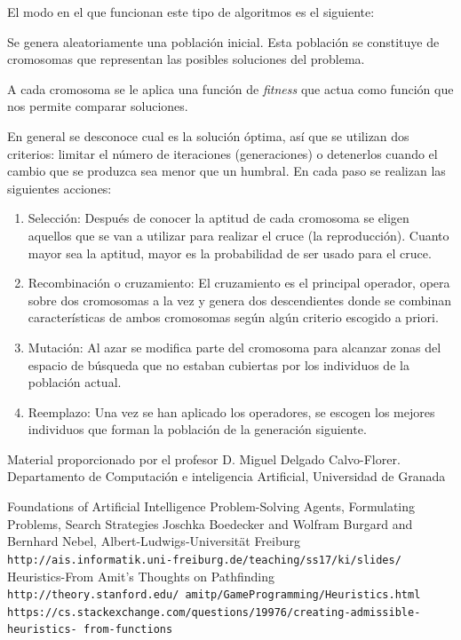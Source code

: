 \documentclass[12pt]{article}
\begin{document}
El modo en el que funcionan este tipo de algoritmos es el siguiente:

Se genera aleatoriamente una población inicial. Esta población se
constituye de cromosomas que representan las posibles soluciones del
problema.

A cada cromosoma se le aplica una función de \textit{fitness} que
actua como función que nos permite comparar soluciones.

En general se desconoce cual es la solución óptima, así que se
utilizan dos criterios: limitar el número de iteraciones
(generaciones) o detenerlos cuando el cambio que se produzca sea menor
que un humbral. En cada paso se realizan las siguientes acciones:

\begin{enumerate}
\item Selección: Después de conocer la aptitud de cada cromosoma se
  eligen aquellos que se van a utilizar para realizar el cruce (la
  reproducción). Cuanto mayor sea la aptitud, mayor es la probabilidad
  de ser usado para el cruce.

\item Recombinación o cruzamiento: El cruzamiento es el principal
  operador, opera sobre dos cromosomas a la vez y genera dos
  descendientes donde se combinan características de ambos cromosomas
  según algún criterio escogido a priori.

\item Mutación: Al azar se modifica parte del cromosoma para alcanzar
  zonas del espacio de búsqueda que no estaban cubiertas por los
  individuos de la población actual.

\item Reemplazo: Una vez se han aplicado los operadores, se escogen
  los mejores individuos que forman la población de la generación
  siguiente.
\end{enumerate}

\begin{thebibliography}{9}
Material proporcionado por el profesor
D. Miguel Delgado Calvo-Florer. Departamento de Computación e inteligencia Artificial, Universidad de Granada
 
Foundations of Artificial Intelligence
Problem-Solving Agents, Formulating Problems, Search Strategies
Joschka Boedecker and Wolfram Burgard and Bernhard Nebel, Albert-Ludwigs-Universität Freiburg
\texttt{http://ais.informatik.uni-freiburg.de/teaching/ss17/ki/slides/}
  Heuristics-From Amit’s Thoughts on Pathfinding\\
  \texttt{http://theory.stanford.edu/~amitp/GameProgramming/Heuristics.html}
  \texttt{https://cs.stackexchange.com/questions/19976/creating-admissible-heuristics-
    from-functions}
\end{thebibliography}
\end{document}
